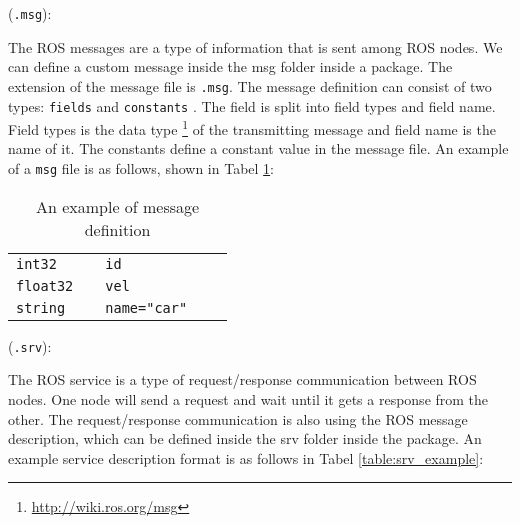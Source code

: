 \begin{description}[leftmargin=0in, labelindent=0pt]
{%

}

\item[Message](\texttt{.msg}): {The ROS messages are a type of information that is sent among ROS nodes. We can define a custom message inside the msg folder inside a package. The extension of the message file is \texttt{.msg}. The message definition can consist of two types: \texttt{fields} and \texttt{constants} . The field is split into field types and field name. Field types is the data type \footnote{\url{http://wiki.ros.org/msg}} of the transmitting message and field name is the name of it. The constants define a constant value in the message file. An example of a \texttt{msg} file is as follows, shown in Tabel \ref{table:msg_example}:
\begin{table}[h!]
\centering
\begin{tabular}{|lll|ll}
\cline{1-3}
\texttt{int32}   &  & \texttt{id}         &  &  \\
\texttt{float32} &  & \texttt{vel}        &  &  \\
\texttt{string}  &  & \texttt{name="car"} &  & \\ \cline{1-3}
\end{tabular}
\caption{An example of message definition}
\label{table:msg_example}
\end{table}
} 

\item[Services](\texttt{.srv}): {The ROS service is a type of request/response communication between ROS nodes. One node will send a request and wait until it gets a response from the other. The request/response communication is also using the ROS message description, which can be defined inside the srv folder inside the package. An example service description format is as follows in Tabel \ref{table:srv_example}:

}
\end{description}
